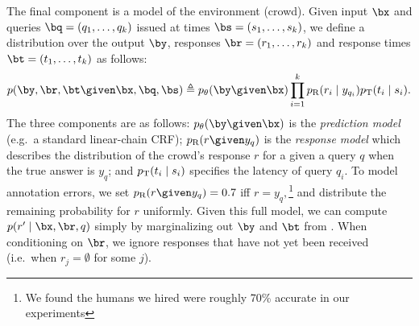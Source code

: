 The final component is a model of the environment (crowd).
Given input $\bx$ and queries $\bq = (q_1, \dots, q_k)$ issued at times $\bs = (s_1, \dots, s_k)$,
we define a distribution over the output $\by$, responses $\br = (r_1, \dots, r_k)$
and response times $\bt = (t_1, \dots, t_k)$ as follows:
\begin{align}
  \label{eqn:dynamics}
p(\by, \br, \bt \given \bx, \bq, \bs) \eqdef \p(\by \given \bx) \prod_{i=1}^k \presp(r_i \mid y_{q_i}) \ptime(t_i \mid s_i).
\end{align}
The three components are as follows:
$\p(\by \given \bx)$ is the \emph{prediction model} (e.g.\ a standard linear-chain CRF);
$\presp(r \given y_q)$ is the \emph{response model} which describes the
distribution of the crowd's response $r$ for a given a query $q$ when the true
answer is $y_q$;
and $p_{\text{T}}(t_i \mid s_i)$ specifies the latency of query $q_i$.
To model annotation errors, we set $\presp(r \given y_q)
= 0.7$ iff $r = y_q,$\footnote{We found the humans we hired were roughly 70\%
accurate in our experiments} and distribute the remaining probability for $r$
uniformly.
%
%
Given this full model, we can compute $p(r' \mid \bx, \br, q)$ simply by marginalizing out $\by$ and $\bt$ from .
When conditioning on $\br$, we ignore responses that have not yet been received (i.e.\ when $r_j = \emptyset$ for some $j$).

